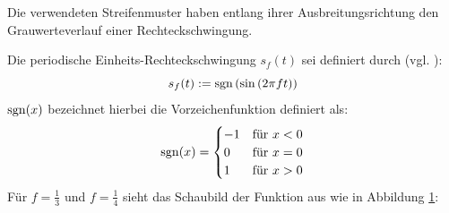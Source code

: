 Die verwendeten Streifenmuster haben entlang ihrer Ausbreitungsrichtung den Grauwerteverlauf einer Rechteckschwingung.

\noindent
Die periodische Einheits-Rechteckschwingung $s_f(t)$ sei definiert durch (vgl. \cite{squareWave}):
%
\begin{equation} \label{eq:einheitsrechteckschwingung}
	s_f(t) := \operatorname{sgn} \left( \sin \left(2 \pi f t \right) \right)
\end{equation}
%
$\operatorname{sgn}(x)$ bezeichnet hierbei die Vorzeichenfunktion definiert als:
%
\begin{equation*} \label{eq:vorzeichenfunktion}
	\operatorname{sgn}(x) = 
		\begin{cases}
	      -1 & \text{für $x < 0$}\\
	      0 & \text{für $x = 0$}\\
	      1 & \text{für $x > 0$}
	    \end{cases} 
\end{equation*}
%
Für $f = \tfrac{1}{3}$ und $f = \tfrac{1}{4}$ sieht das Schaubild der Funktion aus wie in Abbildung \ref{tikz:abbRechteckschwingung}:
{
	\begin{figure}[H]
		\centering
		
		\label{tikz:abbRechteckschwingung}
	\end{figure}
}

